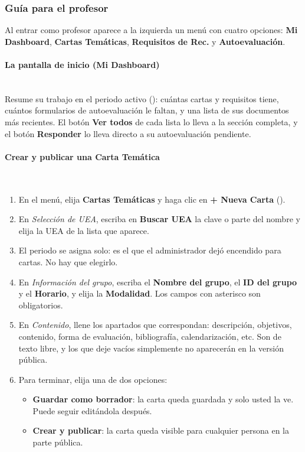 \subsubsection{Guía para el profesor}\label{apx:manual-user:profesor}

Al entrar como profesor aparece a la izquierda un menú con cuatro opciones: \textbf{Mi Dashboard}, \textbf{Cartas Temáticas}, \textbf{Requisitos de Rec.} y \textbf{Autoevaluación}.

\paragraph{La pantalla de inicio (Mi Dashboard)}\mbox{}\\
Resume su trabajo en el periodo activo (): cuántas cartas y requisitos tiene, cuántos formularios de autoevaluación le faltan, y una lista de sus documentos más recientes. El botón \textbf{Ver todos} de cada lista lo lleva a la sección completa, y el botón \textbf{Responder} lo lleva directo a su autoevaluación pendiente.

\paragraph{Crear y publicar una Carta Temática}\label{apx:manual-user:profesor-carta}\mbox{}\\
\begin{enumerate}
    \item En el menú, elija \textbf{Cartas Temáticas} y haga clic en \textbf{+ Nueva Carta} ().
    \item En \emph{Selección de UEA}, escriba en \textbf{Buscar UEA} la clave o parte del nombre y elija la UEA de la lista que aparece.
    \item El periodo se asigna solo: es el que el administrador dejó encendido para cartas. No hay que elegirlo.
    \item En \emph{Información del grupo}, escriba el \textbf{Nombre del grupo}, el \textbf{ID del grupo} y el \textbf{Horario}, y elija la \textbf{Modalidad}. Los campos con asterisco son obligatorios.
    \item En \emph{Contenido}, llene los apartados que correspondan: descripción, objetivos, contenido, forma de evaluación, bibliografía, calendarización, etc. Son de texto libre, y los que deje vacíos simplemente no aparecerán en la versión pública.
    \item Para terminar, elija una de dos opciones:
    \begin{itemize}
        \item \textbf{Guardar como borrador}: la carta queda guardada y solo usted la ve. Puede seguir editándola después.
        \item \textbf{Crear y publicar}: la carta queda visible para cualquier persona en la parte pública.
    \end{itemize}
\end{enumerate}


